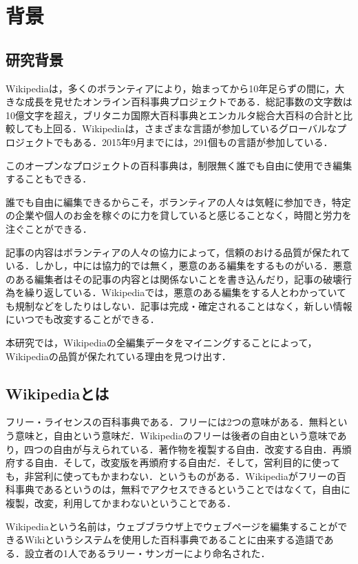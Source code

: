 \chapter{背景}

\section{研究背景}
Wikipediaは，多くのボランティアにより，始まってから10年足らずの間に，大きな成長を見せたオンライン百科事典プロジェクトである．総記事数の文字数は10億文字を超え，ブリタニカ国際大百科事典とエンカルタ総合大百科の合計と比較しても上回る．Wikipediaは，さまざまな言語が参加しているグローバルなプロジェクトでもある．2015年9月までには，291個もの言語が参加している．

このオープンなプロジェクトの百科事典は，制限無く誰でも自由に使用でき編集することもできる．

誰でも自由に編集できるからこそ，ボランティアの人々は気軽に参加でき，特定の企業や個人のお金を稼ぐのに力を貸していると感じることなく，時間と労力を注ぐことができる．

記事の内容はボランティアの人々の協力によって，信頼のおける品質が保たれている．しかし，中には協力的では無く，悪意のある編集をするものがいる．悪意のある編集者はその記事の内容とは関係ないことを書き込んだり，記事の破壊行為を繰り返している．Wikipediaでは，悪意のある編集をする人とわかっていても規制などをしたりはしない．記事は完成・確定されることはなく，新しい情報にいつでも改変することができる．

本研究では，Wikipediaの全編集データをマイニングすることによって，Wikipediaの品質が保たれている理由を見つけ出す．



\section{Wikipediaとは}

フリー・ライセンスの百科事典である．フリーには2つの意味がある．無料という意味と，自由という意味だ．Wikipediaのフリーは後者の自由という意味であり，四つの自由が与えられている．著作物を複製する自由．改変する自由．再頒府する自由．そして，改変版を再頒府する自由だ．そして，営利目的に使っても，非営利に使ってもかまわない．というものがある．Wikipediaがフリーの百科事典であるというのは，無料でアクセスできるということではなくて，自由に複製，改変，利用してかまわないということである．

Wikipediaという名前は，ウェブブラウザ上でウェブページを編集することができるWikiというシステムを使用した百科事典であることに由来する造語である．設立者の1人であるラリー・サンガーにより命名された．


